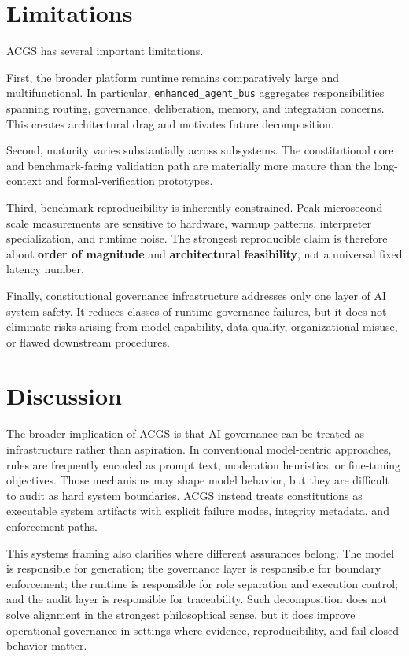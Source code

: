 \documentclass[11pt]{article}
\begin{document}
\section{Limitations}
ACGS has several important limitations.

First, the broader platform runtime remains comparatively large and multifunctional. In particular, \texttt{enhanced\_agent\_bus} aggregates responsibilities spanning routing, governance, deliberation, memory, and integration concerns. This creates architectural drag and motivates future decomposition.

Second, maturity varies substantially across subsystems. The constitutional core and benchmark-facing validation path are materially more mature than the long-context and formal-verification prototypes.

Third, benchmark reproducibility is inherently constrained. Peak microsecond-scale measurements are sensitive to hardware, warmup patterns, interpreter specialization, and runtime noise. The strongest reproducible claim is therefore about \textbf{order of magnitude} and \textbf{architectural feasibility}, not a universal fixed latency number.

Finally, constitutional governance infrastructure addresses only one layer of AI system safety. It reduces classes of runtime governance failures, but it does not eliminate risks arising from model capability, data quality, organizational misuse, or flawed downstream procedures.

\section{Discussion}
The broader implication of ACGS is that AI governance can be treated as infrastructure rather than aspiration. In conventional model-centric approaches, rules are frequently encoded as prompt text, moderation heuristics, or fine-tuning objectives. Those mechanisms may shape model behavior, but they are difficult to audit as hard system boundaries. ACGS instead treats constitutions as executable system artifacts with explicit failure modes, integrity metadata, and enforcement paths.

This systems framing also clarifies where different assurances belong. The model is responsible for generation; the governance layer is responsible for boundary enforcement; the runtime is responsible for role separation and execution control; and the audit layer is responsible for traceability. Such decomposition does not solve alignment in the strongest philosophical sense, but it does improve operational governance in settings where evidence, reproducibility, and fail-closed behavior matter.
\end{document}
